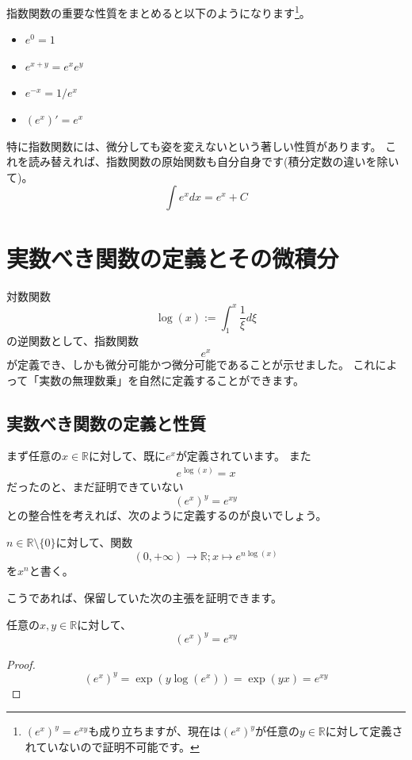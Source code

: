 指数関数の重要な性質をまとめると以下のようになります\footnote{
  $(e^x)^y=e^{xy}$も成り立ちますが、現在は$(e^x)^y$が任意の$y\in\mathbb{R}$に対して定義されていないので証明不可能です。
}。
\begin{itemize}
  \item $e^0=1$
  \item $e^{x+y}=e^xe^y$
  \item $e^{-x}=1/e^x$
  \item $(e^x)'=e^x$
\end{itemize}

特に指数関数には、微分しても姿を変えないという著しい性質があります。
これを読み替えれば、指数関数の原始関数も自分自身です(積分定数の違いを除いて)。
\[
  \int e^x dx = e^x + C
\]



\section{実数べき関数の定義とその微積分}

対数関数
\[
  \log(x):=\int_1^x \frac1\xi d\xi
\]
の逆関数として、指数関数
\[
  e^x
\]
が定義でき、しかも微分可能かつ微分可能であることが示せました。
これによって「実数の無理数乗」を自然に定義することができます。

\subsection{実数べき関数の定義と性質}

まず任意の$x\in\mathbb{R}$に対して、既に$e^x$が定義されています。
また
\begin{align*}
  e^{\log(x)}=x
\end{align*}
だったのと、まだ証明できていない
\[
  (e^x)^y=e^{xy}
\]
との整合性を考えれば、次のように定義するのが良いでしょう。
\begin{definition}
  $n\in\mathbb{R}\setminus\{0\}$に対して、関数
  \[
    (0,+\infty)\to\mathbb{R};x\mapsto e^{n\log(x)}
  \]
  を$x^n$と書く。
\end{definition}

こうであれば、保留していた次の主張を証明できます。
\begin{theorem}
  任意の$x,y\in\mathbb{R}$に対して、
  \[
    (e^x)^y=e^{xy}
  \]
\end{theorem}
\begin{proof}
  \[
    (e^x)^y=\exp(y\log(e^x))=\exp(yx)=e^{xy}
  \]
\end{proof}

